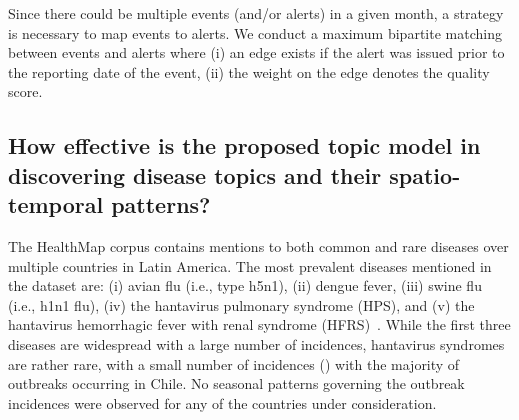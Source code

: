 \documentclass[twoside,leqno,twocolumn]{article}
\begin{document}
\vspace{5pt} Since there could be multiple events (and/or alerts) in a given month, a strategy is necessary to map events to alerts. We conduct a maximum bipartite matching between events and alerts where (i) an edge exists if the alert was issued prior to the reporting date of the event, (ii) the weight on the edge denotes the quality score. 

\subsection{How effective is the proposed topic model in discovering disease topics and their spatio-temporal patterns?} The HealthMap corpus contains mentions to both common and rare diseases over multiple countries in Latin America. The most prevalent diseases mentioned in the dataset are: (i) avian flu (i.e., type h5n1), (ii) dengue fever, (iii) swine flu (i.e., h1n1 flu), (iv) the hantavirus pulmonary syndrome (HPS), and (v) the hantavirus hemorrhagic fever with renal syndrome (HFRS)~\cite{jonsson:10}. 
While the first three diseases are widespread with a large number of incidences, hantavirus syndromes are rather rare, with a small number of incidences () with the majority of outbreaks occurring in Chile. No seasonal patterns governing the outbreak incidences were observed for any of the countries under consideration.

\end{document}
